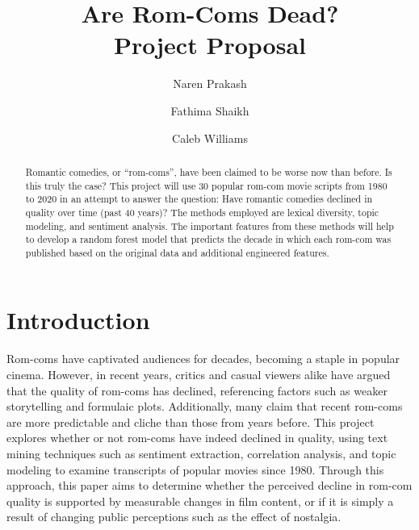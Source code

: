 \documentclass[
  authoryear,
  preprint]{elsarticle}
\begin{document}
\begin{frontmatter}
\title{Are Rom-Coms Dead? \\\large{Project Proposal} }
\author[1]{Naren Prakash%
%
}

\author[1]{Fathima Shaikh%
%
}

\author[1]{Caleb Williams%
%
}






        
\begin{abstract}
Romantic comedies, or ``rom-coms'', have been claimed to be worse now
than before. Is this truly the case? This project will use 30 popular
rom-com movie scripts from 1980 to 2020 in an attempt to answer the
question: Have romantic comedies declined in quality over time (past 40
years)? The methods employed are lexical diversity, topic modeling, and
sentiment analysis. The important features from these methods will help
to develop a random forest model that predicts the decade in which each
rom-com was published based on the original data and additional
engineered features.
\end{abstract}





\end{frontmatter}
    

\section{Introduction}\label{introduction}

Rom-coms have captivated audiences for decades, becoming a staple in
popular cinema. However, in recent years, critics and casual viewers
alike have argued that the quality of rom-coms has declined, referencing
factors such as weaker storytelling and formulaic plots. Additionally,
many claim that recent rom-coms are more predictable and cliche than
those from years before. This project explores whether or not rom-coms
have indeed declined in quality, using text mining techniques such as
sentiment extraction, correlation analysis, and topic modeling to
examine transcripts of popular movies since 1980. Through this approach,
this paper aims to determine whether the perceived decline in rom-com
quality is supported by measurable changes in film content, or if it is
simply a result of changing public perceptions such as the effect of
nostalgia.
\end{document}
